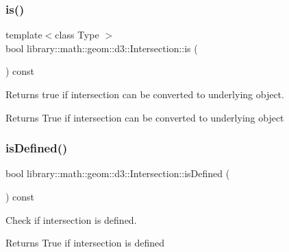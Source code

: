 \subsubsection{\texorpdfstring{is()}{is()}}
{\footnotesize\ttfamily template$<$class Type $>$ \\
bool library\+::math\+::geom\+::d3\+::\+Intersection\+::is (\begin{DoxyParamCaption}{ }\end{DoxyParamCaption}) const\hspace{0.3cm}{\ttfamily [inline]}}



Returns true if intersection can be converted to underlying object. 

\begin{DoxyReturn}{Returns}
True if intersection can be converted to underlying object 
\end{DoxyReturn}
\mbox{\label{classlibrary_1_1math_1_1geom_1_1d3_1_1_intersection_a746fc547529ce91a99412597eb5ae559}} 
\subsubsection{\texorpdfstring{is\+Defined()}{isDefined()}}
{\footnotesize\ttfamily bool library\+::math\+::geom\+::d3\+::\+Intersection\+::is\+Defined (\begin{DoxyParamCaption}{ }\end{DoxyParamCaption}) const}



Check if intersection is defined. 

\begin{DoxyReturn}{Returns}
True if intersection is defined 
\end{DoxyReturn}
\mbox{\label{classlibrary_1_1math_1_1geom_1_1d3_1_1_intersection_aad021013a517375d56e2110792ad7b07}} 

